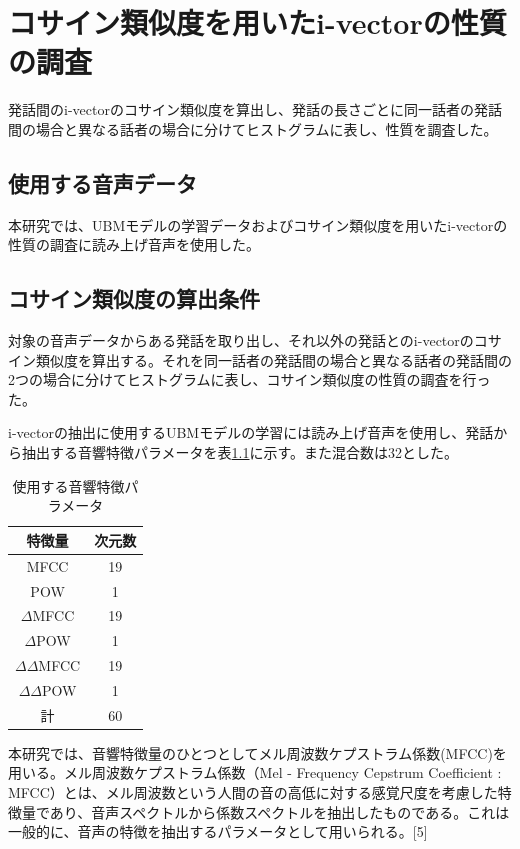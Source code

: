 \chapter{コサイン類似度を用いたi-vectorの性質の調査}
発話間のi-vectorのコサイン類似度を算出し、発話の長さごとに同一話者の発話間の場合と異なる話者の場合に分けてヒストグラムに表し、性質を調査した。
\section{使用する音声データ}
本研究では、UBMモデルの学習データおよびコサイン類似度を用いたi-vectorの性質の調査に読み上げ音声\cite{ATR}を使用した。

\section{コサイン類似度の算出条件}
対象の音声データからある発話を取り出し、それ以外の発話とのi-vectorのコサイン類似度を算出する。それを同一話者の発話間の場合と異なる話者の発話間の2つの場合に分けてヒストグラムに表し、コサイン類似度の性質の調査を行った。\par
i-vectorの抽出に使用するUBMモデルの学習には読み上げ音声\cite{ATR}を使用し、発話から抽出する音響特徴パラメータを表\ref{iv_feature}に示す。また混合数は32とした。

\begin{table}[htb]
  \begin{center}
    \caption{使用する音響特徴パラメータ}
    \label{iv_feature}
    \begin{tabular}{|c||c|} \hline
      特徴量 & 次元数\\ \hline
      MFCC & 19  \\ \hline
      POW & 1  \\ \hline
      $\Delta$MFCC & 19 \\ \hline
      $\Delta$POW & 1 \\ \hline
      $\Delta\Delta$MFCC & 19 \\ \hline
      $\Delta\Delta$POW & 1 \\ \hline
      計 & 60 \\ \hline
    \end{tabular}
  \end{center}
\end{table}

本研究では、音響特徴量のひとつとしてメル周波数ケプストラム係数(MFCC)を用いる。メル周波数ケプストラム係数（Mel - Frequency Cepstrum Coefficient : MFCC）とは、メル周波数という人間の音の高低に対する感覚尺度を考慮した特徴量であり、音声スペクトルから係数スペクトルを抽出したものである。これは一般的に、音声の特徴を抽出するパラメータとして用いられる。[5]

